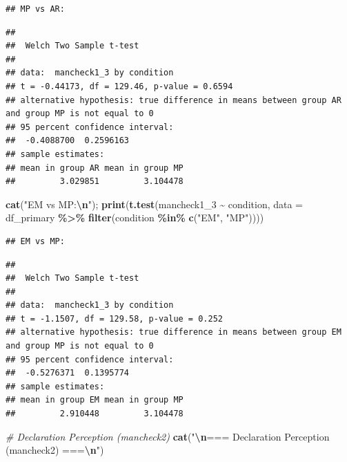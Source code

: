 \documentclass[
]{article}
\newenvironment{Shaded}{\begin{snugshade}}{\end{snugshade}}
\newcommand{\AttributeTok}[1]{\textcolor[rgb]{0.13,0.29,0.53}{#1}}
\newcommand{\CommentTok}[1]{\textcolor[rgb]{0.56,0.35,0.01}{\textit{#1}}}
\newcommand{\FunctionTok}[1]{\textcolor[rgb]{0.13,0.29,0.53}{\textbf{#1}}}
\newcommand{\NormalTok}[1]{#1}
\newcommand{\SpecialCharTok}[1]{\textcolor[rgb]{0.81,0.36,0.00}{\textbf{#1}}}
\newcommand{\StringTok}[1]{\textcolor[rgb]{0.31,0.60,0.02}{#1}}
\begin{document}
\begin{verbatim}
## MP vs AR:
\end{verbatim}

\begin{verbatim}
## 
##  Welch Two Sample t-test
## 
## data:  mancheck1_3 by condition
## t = -0.44173, df = 129.46, p-value = 0.6594
## alternative hypothesis: true difference in means between group AR and group MP is not equal to 0
## 95 percent confidence interval:
##  -0.4088700  0.2596163
## sample estimates:
## mean in group AR mean in group MP 
##         3.029851         3.104478
\end{verbatim}

\begin{Shaded}
\begin{Highlighting}[]
\FunctionTok{cat}\NormalTok{(}\StringTok{"EM vs MP:}\SpecialCharTok{\textbackslash{}n}\StringTok{"}\NormalTok{); }\FunctionTok{print}\NormalTok{(}\FunctionTok{t.test}\NormalTok{(mancheck1\_3 }\SpecialCharTok{\textasciitilde{}}\NormalTok{ condition, }
       \AttributeTok{data =}\NormalTok{ df\_primary }\SpecialCharTok{\%\textgreater{}\%} \FunctionTok{filter}\NormalTok{(condition }\SpecialCharTok{\%in\%} \FunctionTok{c}\NormalTok{(}\StringTok{"EM"}\NormalTok{, }\StringTok{"MP"}\NormalTok{))))}
\end{Highlighting}
\end{Shaded}

\begin{verbatim}
## EM vs MP:
\end{verbatim}

\begin{verbatim}
## 
##  Welch Two Sample t-test
## 
## data:  mancheck1_3 by condition
## t = -1.1507, df = 129.58, p-value = 0.252
## alternative hypothesis: true difference in means between group EM and group MP is not equal to 0
## 95 percent confidence interval:
##  -0.5276371  0.1395774
## sample estimates:
## mean in group EM mean in group MP 
##         2.910448         3.104478
\end{verbatim}

\begin{Shaded}
\begin{Highlighting}[]
\CommentTok{\# Declaration Perception (mancheck2)}
\FunctionTok{cat}\NormalTok{(}\StringTok{"}\SpecialCharTok{\textbackslash{}n}\StringTok{=== Declaration Perception (mancheck2) ===}\SpecialCharTok{\textbackslash{}n}\StringTok{"}\NormalTok{)}
\end{Highlighting}
\end{Shaded}
\end{document}
